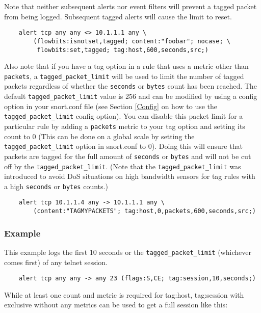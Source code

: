 \documentclass[english]{report}
\begin{document}
Note that neither subsequent alerts nor event filters will prevent a tagged
packet from being logged.  Subsequent tagged alerts will cause the limit to
reset.

\begin{verbatim}
    alert tcp any any <> 10.1.1.1 any \
        (flowbits:isnotset,tagged; content:"foobar"; nocase; \
         flowbits:set,tagged; tag:host,600,seconds,src;)
\end{verbatim}

Also note that if you have a tag option in a rule that uses a metric other than
\texttt{packets}, a \texttt{tagged\_packet\_limit} will be used to limit the
number of tagged packets regardless of whether the \texttt{seconds} or
\texttt{bytes} count has been reached.  The default
\texttt{tagged\_packet\_limit} value is 256 and can be modified by using a
config option in your snort.conf file (see Section \ref{Config} on how to use
the \texttt{tagged\_packet\_limit} config option).  You can disable this packet
limit for a particular rule by adding a \texttt{packets} metric to your tag
option and setting its count to 0 (This can be done on a global scale by
setting the \texttt{tagged\_packet\_limit} option in snort.conf to 0).  Doing
this will ensure that packets are tagged for the full amount of
\texttt{seconds} or \texttt{bytes} and will not be cut off by the
\texttt{tagged\_packet\_limit}.  (Note that the \texttt{tagged\_packet\_limit}
was introduced to avoid DoS situations on high bandwidth sensors for tag rules
with a high \texttt{seconds} or \texttt{bytes} counts.)

\begin{verbatim}
    alert tcp 10.1.1.4 any -> 10.1.1.1 any \
        (content:"TAGMYPACKETS"; tag:host,0,packets,600,seconds,src;)
\end{verbatim}

\subsubsection{Example}

This example logs the first 10 seconds or the \texttt{tagged\_packet\_limit}
(whichever comes first) of any telnet session.

\begin{verbatim}
    alert tcp any any -> any 23 (flags:S,CE; tag:session,10,seconds;)
\end{verbatim}

While at least one count and metric is required for tag:host, tag:session
with exclusive without any metrics can be used to get a full session like
this:
\end{document}
